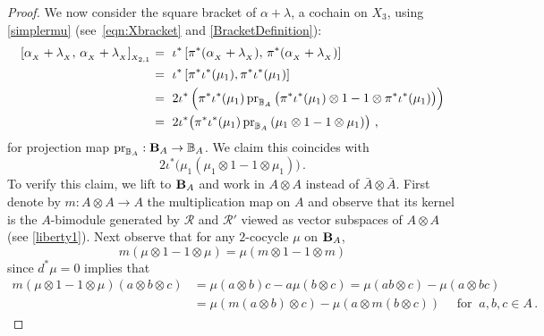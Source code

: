 \documentclass[11pt]{amsart}
\numberwithin{equation}{section}
\newcommand{\X}{_X}
\newcommand{\alphax}{\alpha_{\X}}
\newcommand{\lambdax}{\lambda_{\X}}
\newcommand{\A}{A}%
\newcommand{\pr}{ {\rm{pr}} }%
\newcommand{\sA}{A }
\newcommand{\R}{\mathcal{R}}
\newcommand{\B}{{\bf B}} %
\newcommand{\BB}{\mathbb{B}} %
\renewcommand{\_}[1]{\mbox{$_{\left( #1 \right)}$}}
\newcommand{\ot}{\otimes}
\begin{document}
{\begin{proof}
  
We now consider the square bracket of $\alpha+\lambda$,
a cochain on $X_{3}$, using \cref{simplermu}
(see~\cref{eqn:Xbracket} and \cref{BracketDefinition}):
\begin{equation}\label{SuppressingInBracket}
  \begin{aligned}
  [\alphax + \lambdax, \, \alphax+\lambdax]_{_{X_{2,1}}} 
  & = \ \iota^*\, [\pi^*(\alphax+\lambdax),\, \pi^*(\alphax + \lambdax) ] \\
   & = \ \iota^*\, [\pi^*\iota^*(\mu_1),\pi^*\iota^*(\mu_1)]\\
  & =\
        2 \iota^*\, \Big(\pi^*\iota^*(\mu_1) \, \pr_{\BB_A}\,
        \big(\pi^*\iota^*(\mu_1)\ot 1
        - 1\ot \pi^*\iota^*(\mu_1)\big)\Big) \\
  & = \
        2\iota^*\big(\pi^*\iota^*(\mu_1) \, \pr_{\BB_A}\, (\mu_1\ot 1 - 1\ot \mu_1)\big)\, 
        \, ,
        \end{aligned}
        \end{equation}
for projection map
$\pr_{\BB_A}:\B_A\rightarrow \BB_A$.
We claim this coincides with
$$2\iota^*\big(\mu_1  (\mu_1\ot 1 - 1\ot \mu_1)\big)\, .$$
To verify this claim, we lift to $\B_A$ and work in $A\ot A$ instead
of $\bar A \ot \bar A$.
First 
denote by $m: \A\ot\A\rightarrow A$ the multiplication map on $A$
and observe that its kernel 
is the $A$-bimodule 
generated by $\R$ and $\R'$ viewed as vector subspaces of 
$A\ot A$ (see \cref{liberty1}).
Next observe that for any $2$-cocycle $\mu$ on $\B_A$,
\begin{equation}\label{CocylesAndMultMaps}
m(\mu\ot 1 - 1\ot \mu)=\mu(m\ot 1 -1\ot m)
\end{equation}
since $d^*\mu=0$ 
implies that
\begin{equation*}
\begin{aligned}
  m(\mu\ot 1 - 1\ot \mu)( a \ot b \ot c )
  &=\mu(a\ot b)c-a\mu(b\ot c)
  =\mu(ab\ot c)-\mu(a\ot bc)\\
  &=\mu(m(a\ot b)\ot c)-\mu(a\ot m(b \ot c))
\quad\text{ for }\ a,b,c\in \A\, .
\end{aligned}
\end{equation*}


\end{proof}}
\end{document}
